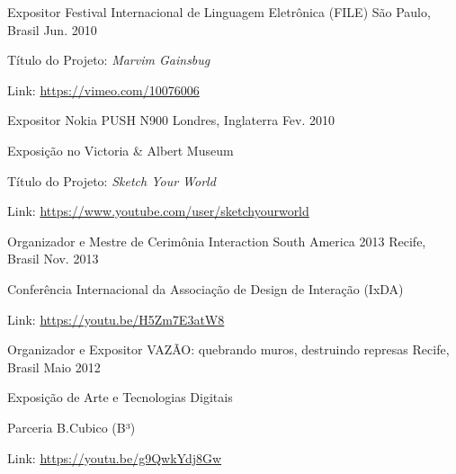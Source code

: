 \begin{cventries}
\cventry
	{Expositor}
	{Festival Internacional de Linguagem Eletrônica (FILE)}
	{São Paulo, Brasil}
	{Jun. 2010}
	{\begin{cvitems}
		\item{Título do Projeto: \textit{Marvim Gainsbug}}
		\item{Link: \href{https://vimeo.com/10076006}{https://vimeo.com/10076006}}
	\end{cvitems}}

\cventry
	{Expositor}
	{Nokia PUSH N900}
	{Londres, Inglaterra}
	{Fev. 2010}
	{\begin{cvitems}
		\item{Exposição no Victoria \& Albert Museum}
		\item{Título do Projeto: \textit{Sketch Your World}}
		\item{Link: \href{https://www.youtube.com/user/sketchyourworld}{https://www.youtube.com/user/sketchyourworld}}
	\end{cvitems}}
\end{cventries}
\begin{cventries}
  \cventry
    {Organizador e Mestre de Cerimônia} %
    {Interaction South America 2013} %
    {Recife, Brasil} %
    {Nov. 2013} %
    {
      \begin{cvitems} %
        \item {Conferência Internacional da Associação de Design de Interação (IxDA)}
        \item {Link: \href{https://youtu.be/H5Zm7E3atW8}{https://youtu.be/H5Zm7E3atW8}}
      \end{cvitems}
    }

  \cventry
    {Organizador e Expositor} %
    {VAZÃO: quebrando muros, destruindo represas} %
    {Recife, Brasil} %
    {Maio 2012} %
    {
      \begin{cvitems} %
        \item {Exposição de Arte e Tecnologias Digitais}
        \item {Parceria B.Cubico (B³)}
        \item {Link: \href{https://youtu.be/g9QwkYdj8Gw}{https://youtu.be/g9QwkYdj8Gw}}
      \end{cvitems}
    }

\end{cventries}
